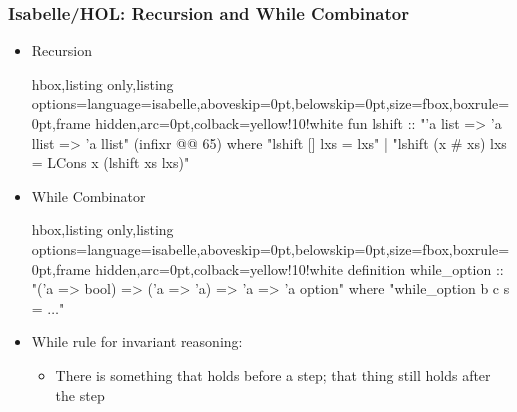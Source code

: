 \documentclass[aspectratio=169,10pt]{beamer}
\begin{document}
\begin{frame}[fragile]
  \frametitle{Isabelle/HOL: Recursion and While Combinator}
  \begin{itemize}
    \item Recursion

\begin{tcblisting}{hbox,listing only,listing options={language=isabelle,aboveskip=0pt,belowskip=0pt},size=fbox,boxrule=0pt,frame hidden,arc=0pt,colback=yellow!10!white}
fun lshift :: "'a list => 'a llist => 'a llist" (infixr @@ 65) where
  "lshift [] lxs = lxs"
| "lshift (x # xs) lxs = LCons x (lshift xs lxs)"
\end{tcblisting}
  \item While Combinator
\begin{tcblisting}{hbox,listing only,listing options={language=isabelle,aboveskip=0pt,belowskip=0pt},size=fbox,boxrule=0pt,frame hidden,arc=0pt,colback=yellow!10!white}
definition while_option :: "('a => bool) => ('a => 'a) => 'a => 'a option" where
"while_option b c s = $\ldots$"
\end{tcblisting}
    \item While rule for invariant reasoning:
          \begin{itemize}
            \item There is something that holds before a step; that thing still holds after the step
          \end{itemize}
          \end{itemize}
\end{frame}
\end{document}
